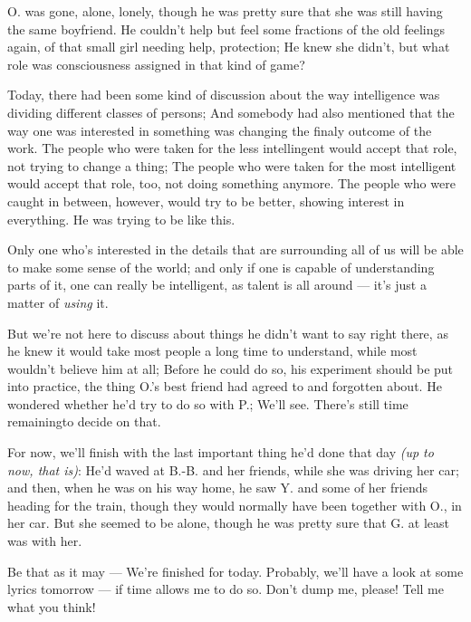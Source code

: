 O. was gone, alone, lonely, though he was pretty sure that she was still having the same boyfriend. He couldn't help but feel some fractions of the old feelings again, of that small girl needing help, protection; He knew she didn't, but what role was consciousness assigned in that kind of game?

Today, there had been some kind of discussion about the way intelligence was dividing different classes of persons; And somebody had also mentioned that the way one was interested in something was changing the finaly outcome of the work. The people who were taken for the less intellingent would accept that role, not trying to change a thing; The people who were taken for the most intelligent would accept that role, too, not doing something anymore. The people who were caught in between, however, would try to be better, showing interest in everything. 
He was trying to be like this.

Only one who's interested in the details that are surrounding all of us will be able to make some sense of the world; and only if one is capable of understanding parts of it, one can really be intelligent, as talent is all around --- it's just a matter of \emph{using} it.

But we're not here to discuss about things he didn't want to say right there, as he knew it would take most people a long time to understand, while most wouldn't believe him at all; Before he could do so, his experiment should be put into practice, the thing O.'s best friend had agreed to and forgotten about. He wondered whether he'd try to do so with P.; We'll see. 
There's still time remainingto decide on that.

For now, we'll finish with the last important thing he'd done that day \emph{(up to now, that is)}: He'd waved at B.-B. and her friends, while she was driving her car; and then, when he was on his way home, he saw Y. and some of her friends heading for the train, though they would normally have been together with O., in her car. But she seemed to be alone, though he was pretty sure that G. at least was with her.

Be that as it may --- 
We're finished for today. 
Probably, we'll have a look at some lyrics tomorrow --- if time allows me to do so. 
Don't dump me, please!
Tell me what you think!


